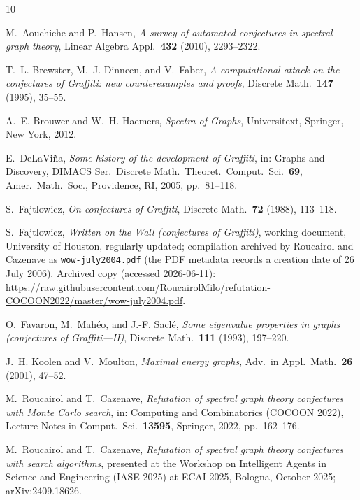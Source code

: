 \documentclass[11pt]{article}
\theoremstyle{remark}
\begin{document}
\begin{thebibliography}{10}

M.~Aouchiche and P.~Hansen,
\emph{A survey of automated conjectures in spectral graph theory},
Linear Algebra Appl.\ \textbf{432} (2010), 2293--2322.

T.~L. Brewster, M.~J. Dinneen, and V.~Faber,
\emph{A computational attack on the conjectures of Graffiti: new
counterexamples and proofs},
Discrete Math.\ \textbf{147} (1995), 35--55.

A.~E. Brouwer and W.~H. Haemers,
\emph{Spectra of Graphs},
Universitext, Springer, New York, 2012.

E.~DeLaVi\~na,
\emph{Some history of the development of Graffiti},
in: Graphs and Discovery, DIMACS Ser.\ Discrete Math.\ Theoret.\ Comput.\
Sci.\ \textbf{69}, Amer.\ Math.\ Soc., Providence, RI, 2005, pp.~81--118.

S.~Fajtlowicz,
\emph{On conjectures of Graffiti},
Discrete Math.\ \textbf{72} (1988), 113--118.

S.~Fajtlowicz,
\emph{Written on the Wall (conjectures of Graffiti)},
working document, University of Houston, regularly updated; compilation
archived by Roucairol and Cazenave as \texttt{wow-july2004.pdf} (the PDF
metadata records a creation date of 26 July 2006). Archived copy (accessed
2026-06-11):
\url{https://raw.githubusercontent.com/RoucairolMilo/refutation-COCOON2022/master/wow-july2004.pdf}.

O.~Favaron, M.~Mah\'eo, and J.-F. Sacl\'e,
\emph{Some eigenvalue properties in graphs (conjectures of Graffiti---II)},
Discrete Math.\ \textbf{111} (1993), 197--220.

J.~H. Koolen and V.~Moulton,
\emph{Maximal energy graphs},
Adv.\ in Appl.\ Math.\ \textbf{26} (2001), 47--52.

M.~Roucairol and T.~Cazenave,
\emph{Refutation of spectral graph theory conjectures with Monte Carlo
search},
in: Computing and Combinatorics (COCOON 2022), Lecture Notes in Comput.\
Sci.\ \textbf{13595}, Springer, 2022, pp.~162--176.

M.~Roucairol and T.~Cazenave,
\emph{Refutation of spectral graph theory conjectures with search
algorithms},
presented at the Workshop on Intelligent Agents in Science and Engineering
(IASE-2025) at ECAI 2025, Bologna, October 2025; arXiv:2409.18626.

\end{thebibliography}
\end{document}
